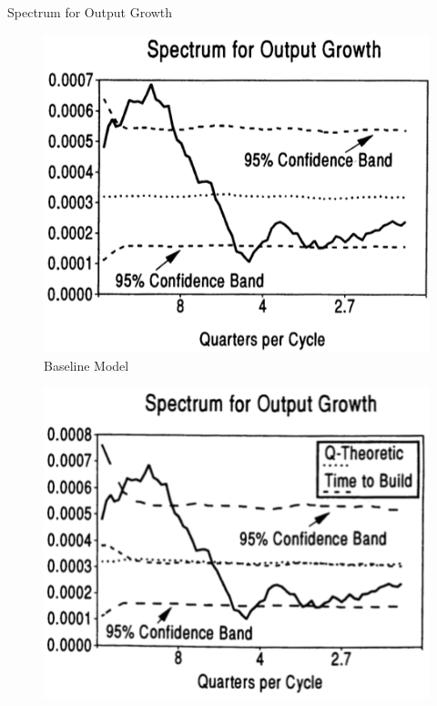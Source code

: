 \documentclass[10pt]{beamer}
\begin{document}
\begin{frame}{Spectrum for Output Growth}
    \begin{minipage}{0.33\textwidth}
        \begin{figure}
            \centering
            \includegraphics[width=\linewidth]{figures/Base_spect.png}
            \caption{Baseline Model}
        \end{figure}
    \end{minipage}%
    \begin{minipage}{0.33\textwidth}
        \begin{figure}
            \centering
            \includegraphics[width=\linewidth]{figures/K_spect.png}

\end{figure}
\end{minipage}
\end{frame}
\end{document}
